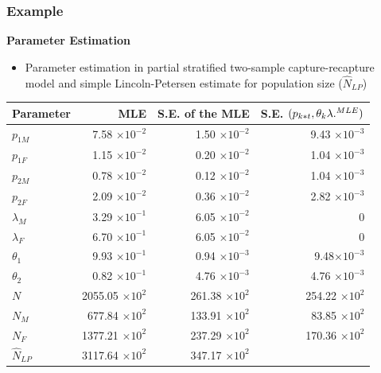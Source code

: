 \documentclass{beamer}
\begin{document}
\begin{frame} \frametitle{Example}
\textbf{{\footnotesize Parameter Estimation }}
\begin{itemize}
\item {\scriptsize Parameter estimation in partial stratified two-sample capture-recapture model and  simple Lincoln-Petersen estimate for  population size ($\hat{N}_{LP}$)}
\end{itemize}
{\tiny
\begin{table}
\centering
\begin{tabular}{|l|r|r|r|}
\hline
Parameter & MLE\qquad \qquad & S.E. of the MLE  &  S.E.  $(p_{k*t},\theta_{k} \lambda{.}^{{\tiny MLE}} )$ \\ \hline
$p_{1M}$ 	& 7.58 $\times 10^{-2}$ 	 & 1.50 $\times 10^{-2}$  &  9.43 $\times 10^{-3}$ \\ \hline
$p_{1F}$ 	& 1.15 $\times 10^{-2}$   	 & 0.20 $\times 10^{-2}$  &  1.04 $\times 10^{-3}$ \\ \hline
$p_{2M}$ 	& 0.78 $\times 10^{-2}$    	 & 0.12 $\times 10^{-2}$  &  1.04 $\times 10^{-3}$ \\ \hline
$p_{2F}$ 	& 2.09 $\times 10^{-2}$		 & 0.36  $\times 10^{-2}$ &  2.82 $\times 10^{-3}$ \\ \hline
$\lambda_{M}$ & 3.29 $\times 10^{-1}$    & 6.05 $\times 10^{-2}$  &   0 \\ \hline
$\lambda_{F}$ & 6.70 $\times 10^{-1}$    & 6.05 $\times 10^{-2}$  &  0 \\ \hline
$\theta_{1}$  & 9.93 $\times 10^{-1}$    & 0.94  $\times 10^{-3}$ &  9.48$\times 10^{-3}$ \\ \hline
$\theta_{2}$  & 0.82 $\times 10^{-1}$    & 4.76  $\times 10^{-3}$  & 4.76 $\times 10^{-3}$ \\ \hline
$N$     & 2055.05 $\times 10^{2}$ \qquad     	 &   261.38 $\times 10^{2}$  \qquad    &  254.22   $\times 10^{2}$  \qquad  \\ \hline
$N_{M}$ &  677.84  $\times 10^{2}$ \qquad    	 &   133.91 $\times 10^{2}$  \qquad    &   83.85  $\times 10^{2}$  \qquad  \\ \hline
$N_{F}$ & 1377.21  $\times 10^{2}$  \qquad     &   237.29 $\times 10^{2}$   \qquad     &  170.36   $\times 10^{2}$  \qquad  \\ \hline \hline
$\hat{N}_{LP}$ & 3117.64  $\times 10^{2}$ & 347.17 $\times 10^{2}$  & \\ \hline


\end{tabular}
\end{table}}
\end{frame}
\end{document}
